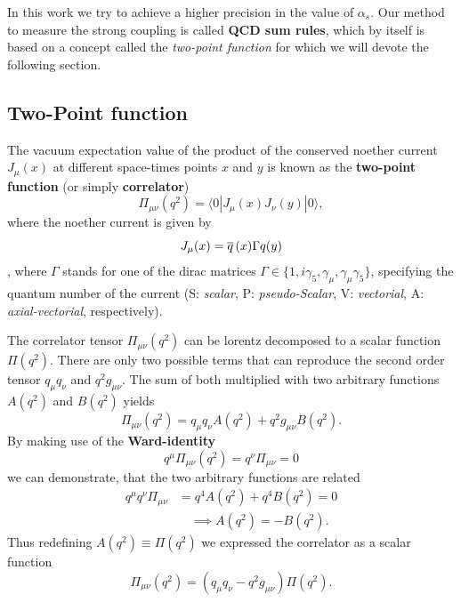 \documentclass[../../index.tex]{subfiles}
\begin{document}
In this work we try to achieve a higher precision in the value of $\alpha_s$.
Our method to measure the strong coupling is called \textbf{QCD sum rules},
which by itself is based on a concept called the \textit{two-point function} for
which we will devote the following section.

\subsection{Two-Point function}
\label{sec:twoPointFunction}
The vacuum expectation value of the product of the conserved
noether current $J_\mu(x)$ at different space-times points $x$ and $y$ is known
as the \textbf{two-point function} (or simply \textbf{correlator})
\begin{equation}
  \label{eq:twoPointFunction}
  \Pi_{\mu\nu}(q^2) = \langle  0 | J_\mu(x) J_\nu(y) | 0 \rangle,
\end{equation}
where the noether current is given by
\begin{equation}
  J_\mu(x) = \overline{q}\,(x) \Gamma q(y)
\end{equation}
, where $\Gamma$ stands for one of the dirac matrices $\Gamma \in \{ 1,
i\gamma_5, \gamma_\mu, \gamma_\mu\gamma_5\}$, specifying the quantum number of
the current (S: \textit{scalar}, P: \textit{pseudo-Scalar}, V:
\textit{vectorial}, A: \textit{axial-vectorial}, respectively). 

The correlator tensor $\Pi_{\mu\nu}(q^2)$ can be lorentz decomposed to a scalar
function $\Pi(q^2)$. There are only two possible terms that can reproduce the
second order tensor $q_\mu q_\nu$ and $q^2 g_{\mu\nu}$. The sum of both
multiplied with two arbitrary functions $A(q^2)$ and $B(q^2)$ yields
\begin{equation}
  \Pi_{\mu\nu}(q^2) = q_\mu q_\nu A(q^2) + q^2 g_{\mu\nu} B(q^2).
\end{equation}
By making use of the \textbf{Ward-identity} \cite{Peskin1995}
\begin{equation}
  \label{eq:wardIdentity}
  q^\mu \Pi_{\mu\nu}(q^2) = q^\nu \Pi_{\mu\nu} = 0
\end{equation}
we can demonstrate, that the two arbitrary functions are related
\begin{equation}
  \begin{split}
    q^\mu q^\nu \Pi_{\mu\nu} &= q^4 A(q^2) + q^4 B(q^2) = 0 \\
    &\quad \implies A(q^2) = -B(q^2).
  \end{split}
\end{equation}
Thus redefining $A(q^2) \equiv \Pi(q^2)$ we expressed the correlator as a scalar function
\begin{equation}
  \Pi_{\mu\nu}(q^2) = (q_\mu q_\nu - q^2 g_{\mu\nu})\Pi(q^2).
\end{equation}
\end{document}
